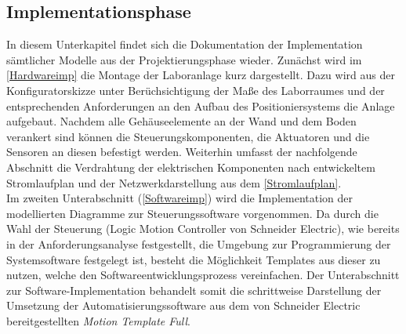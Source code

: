 \documentclass[../../../Bachelorarbeit.tex]{subfiles}
\begin{document}
\subsection{Implementationsphase}
In diesem Unterkapitel findet sich die Dokumentation der Implementation sämtlicher Modelle aus der Projektierungsphase wieder. Zunächst wird im \autoref{Hardwareimp} die Montage der Laboranlage kurz dargestellt. Dazu wird aus der Konfiguratorskizze unter Berüchsichtigung der Maße des Laborraumes und der entsprechenden Anforderungen an den Aufbau des Positioniersystems die Anlage aufgebaut. Nachdem alle Gehäuseelemente an der Wand und dem Boden verankert sind können die Steuerungskomponenten, die Aktuatoren und die Sensoren an diesen befestigt werden. Weiterhin umfasst der nachfolgende Abschnitt die Verdrahtung der elektrischen Komponenten nach entwickeltem Stromlaufplan und der Netzwerkdarstellung aus dem \autoref{Stromlaufplan}.\\
Im zweiten Unterabschnitt (\autoref{Softwareimp}) wird die Implementation der modellierten Diagramme zur Steuerungssoftware vorgenommen. Da durch die Wahl der Steuerung (Logic Motion Controller von Schneider Electric), wie bereits in der Anforderungsanalyse festgestellt, die Umgebung zur Programmierung der Systemsoftware festgelegt ist, besteht die Möglichkeit Templates aus dieser zu nutzen, welche den Softwareentwicklungsprozess vereinfachen. Der Unterabschnitt zur Software-Implementation behandelt somit die schrittweise Darstellung der Umsetzung der Automatisierungssoftware aus dem von Schneider Electric bereitgestellten \textit{Motion Template Full}.
\end{document}
